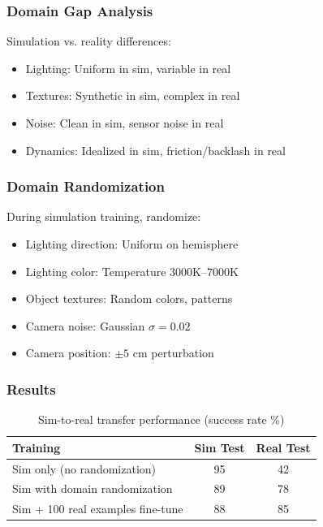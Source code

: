 \subsubsection{Domain Gap Analysis}

Simulation vs. reality differences:
\begin{itemize}
    \item Lighting: Uniform in sim, variable in real
    \item Textures: Synthetic in sim, complex in real
    \item Noise: Clean in sim, sensor noise in real
    \item Dynamics: Idealized in sim, friction/backlash in real
\end{itemize}

\subsubsection{Domain Randomization}

During simulation training, randomize:
\begin{itemize}
    \item Lighting direction: Uniform on hemisphere
    \item Lighting color: Temperature 3000K--7000K
    \item Object textures: Random colors, patterns
    \item Camera noise: Gaussian $\sigma = 0.02$
    \item Camera position: $\pm 5$ cm perturbation
\end{itemize}

\subsubsection{Results}

\begin{table}[htbp]
\centering
\caption{Sim-to-real transfer performance (success rate \%)}
\label{tab:sim_to_real}
\begin{tabular}{lcc}
\toprule
\textbf{Training} & \textbf{Sim Test} & \textbf{Real Test} \\
\midrule
Sim only (no randomization) & 95 & 42 \\
Sim with domain randomization & 89 & 78 \\
Sim + 100 real examples fine-tune & 88 & 85 \\
\bottomrule
\end{tabular}
\end{table}

